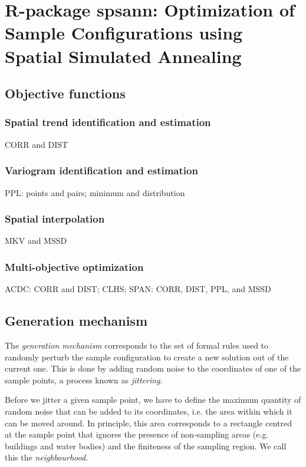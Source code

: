 \artigofalse
\chapter{R-package spsann: Optimization of Sample Configurations using Spatial 
Simulated Annealing}
\label{apen:spsann}

% 

\section{Objective functions}

\subsection{Spatial trend identification and estimation}

CORR and DIST

\subsection{Variogram identification and estimation}

PPL: points and pairs; minimum and distribution

\subsection{Spatial interpolation}

MKV and MSSD

\subsection{Multi-objective optimization}

ACDC: CORR and DIST;
CLHS;
SPAN: CORR, DIST, PPL, and MSSD

\section{Generation mechanism}

The \textit{generation mechanism} corresponds to the set of formal rules used 
to randomly perturb the sample conﬁguration to create a new solution out of the
current one. This is done by adding random noise to the coordinates of one of 
the sample points, a process known as \textit{jittering}.

Before we jitter a given sample point, we have to define the maximum quantity 
of random noise that can be added to its coordinates, i.e. the area within 
which it can be moved around. In principle, this area corresponds to a rectangle
centred at the sample point that ignores the presence of non-sampling areas 
(e.g. buildings and water bodies) and the finiteness of the sampling region. We 
call this the \textit{neighbourhood}.

